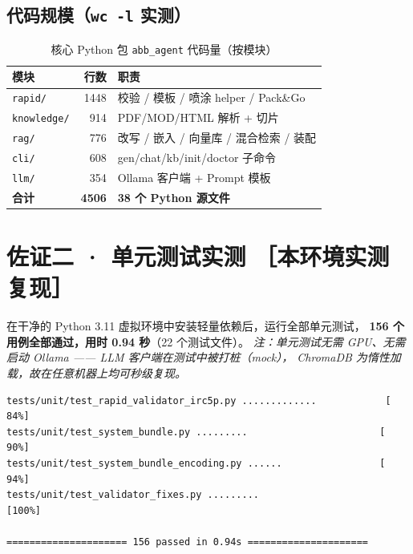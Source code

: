 \documentclass[11pt,a4paper,fontset=none]{ctexart}
\begin{document}
\subsection{代码规模（\texttt{wc -l} 实测）}
\begin{table}[h]
\centering
\caption{核心 Python 包 \texttt{abb\_agent} 代码量（按模块）}
\small
\begin{tabular}{@{}l r l@{}}
\toprule
\textbf{模块} & \textbf{行数} & \textbf{职责} \\
\midrule
\texttt{rapid/}     & 1448 & 校验 / 模板 / 喷涂 helper / Pack\&Go \\
\texttt{knowledge/} & 914  & PDF/MOD/HTML 解析 + 切片 \\
\texttt{rag/}       & 776  & 改写 / 嵌入 / 向量库 / 混合检索 / 装配 \\
\texttt{cli/}       & 608  & gen/chat/kb/init/doctor 子命令 \\
\texttt{llm/}       & 354  & Ollama 客户端 + Prompt 模板 \\
\midrule
\textbf{合计} & \textbf{4506} & \textbf{38 个 Python 源文件} \\
\bottomrule
\end{tabular}
\end{table}

\section{佐证二 · 单元测试实测 \normalfont\small［本环境实测复现］}

在干净的 Python 3.11 虚拟环境中安装轻量依赖后，运行全部单元测试，
\textbf{156 个用例全部通过，用时 0.94 秒}（22 个测试文件）。
\emph{注：单元测试无需 GPU、无需启动 Ollama —— LLM 客户端在测试中被打桩（mock），
ChromaDB 为惰性加载，故在任意机器上均可秒级复现。}

\begin{lstlisting}[style=console,caption={pytest 实跑结尾（终端实录）}]
tests/unit/test_rapid_validator_irc5p.py .............            [ 84%]
tests/unit/test_system_bundle.py .........                       [ 90%]
tests/unit/test_system_bundle_encoding.py ......                 [ 94%]
tests/unit/test_validator_fixes.py .........                     [100%]

===================== 156 passed in 0.94s =====================
\end{lstlisting}
\end{document}
